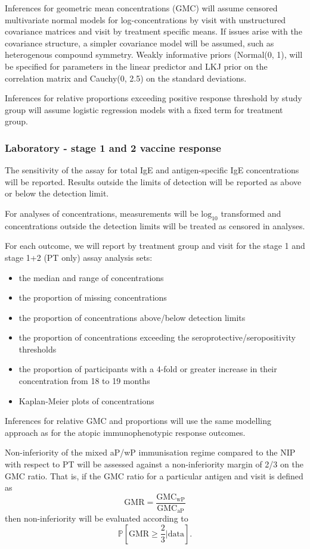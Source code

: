 \documentclass{bmcart}
\begin{document}
Inferences for geometric mean concentrations (GMC) will assume censored multivariate normal models for log-concentrations by visit with unstructured covariance matrices and visit by treatment specific means.
If issues arise with the covariance structure, a simpler covariance model will be assumed, such as heterogenous compound symmetry.
Weakly informative priors (Normal(0, 1), will be specified for parameters in the linear predictor and LKJ prior on the correlation matrix and Cauchy(0, 2.5) on the standard deviations.

Inferences for relative proportions exceeding positive response threshold by study group will assume logistic regression models with a fixed term for treatment group.

\subsubsection*{Laboratory - stage 1 and 2 vaccine response}

The sensitivity of the assay for total IgE and antigen-specific IgE concentrations will be reported.
Results outside the limits of detection will be reported as above or below the detection limit.

For analyses of concentrations, measurements will be $\text{log}_{10}$ transformed and concentrations outside the detection limits will be treated as censored in analyses.

For each outcome, we will report by treatment group and visit for the stage 1 and stage 1+2 (PT only) assay analysis sets:
\begin{itemize}
	\item the median and range of concentrations
	\item the proportion of missing concentrations
	\item the proportion of concentrations above/below detection limits
	\item the proportion of concentrations exceeding the seroprotective/seropositivity thresholds
	\item the proportion of participants with a 4-fold or greater increase in their concentration from 18 to 19 months 
	\item Kaplan-Meier plots of concentrations
\end{itemize}

Inferences for relative GMC and proportions will use the same modelling approach as for the atopic immunophenotypic response outcomes.

Non-inferiority of the mixed aP/wP immunisation regime compared to the NIP with respect to PT will be assessed against a non-inferiority margin of 2/3 on the GMC ratio.
That is, if the GMC ratio for a particular antigen and visit is defined as
$$
\text{GMR} = \frac{\text{GMC}_\text{wP}}{\text{GMC}_\text{aP}}
$$ 
then non-inferiority will be evaluated according to
$$
\mathbb P\left[\text{GMR}\geq \frac{2}{3}\Big\vert \text{data}\right].
$$
\end{document}
